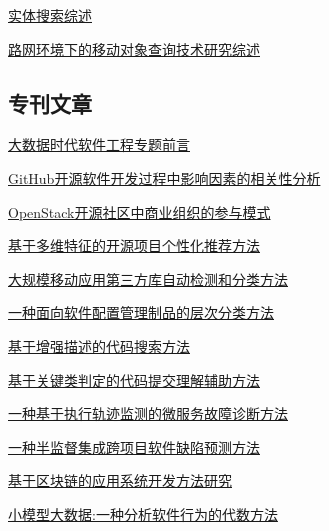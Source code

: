 \documentclass[a4paper]{article}
\begin{document}
\href{http://www.jos.org.cn/ch/reader/create_pdf.aspx?file_no=5256&year_id=2017&quarter_id=6&falg=1}{实体搜索综述}

\href{http://www.jos.org.cn/ch/reader/create_pdf.aspx?file_no=5254&year_id=2017&quarter_id=6&falg=1}{路网环境下的移动对象查询技术研究综述}

\subsection{专刊文章}
\href{http://www.jos.org.cn/ch/reader/create_pdf.aspx?file_no=5233&year_id=2017&quarter_id=6&falg=1}{大数据时代软件工程专题前言}

\href{http://www.jos.org.cn/ch/reader/create_pdf.aspx?file_no=5222&year_id=2017&quarter_id=6&falg=1}{GitHub开源软件开发过程中影响因素的相关性分析}

\href{http://www.jos.org.cn/ch/reader/create_pdf.aspx?file_no=5227&year_id=2017&quarter_id=6&falg=1}{OpenStack开源社区中商业组织的参与模式}

\href{http://www.jos.org.cn/ch/reader/create_pdf.aspx?file_no=5230&year_id=2017&quarter_id=6&falg=1}{基于多维特征的开源项目个性化推荐方法}

\href{http://www.jos.org.cn/ch/reader/create_pdf.aspx?file_no=5221&year_id=2017&quarter_id=6&falg=1}{大规模移动应用第三方库自动检测和分类方法}

\href{http://www.jos.org.cn/ch/reader/create_pdf.aspx?file_no=5224&year_id=2017&quarter_id=6&falg=1}{一种面向软件配置管理制品的层次分类方法}

\href{http://www.jos.org.cn/ch/reader/create_pdf.aspx?file_no=5226&year_id=2017&quarter_id=6&falg=1}{基于增强描述的代码搜索方法}

\href{http://www.jos.org.cn/ch/reader/create_pdf.aspx?file_no=5225&year_id=2017&quarter_id=6&falg=1}{基于关键类判定的代码提交理解辅助方法}

\href{http://www.jos.org.cn/ch/reader/create_pdf.aspx?file_no=5223&year_id=2017&quarter_id=6&falg=1}{一种基于执行轨迹监测的微服务故障诊断方法}

\href{http://www.jos.org.cn/ch/reader/create_pdf.aspx?file_no=5228&year_id=2017&quarter_id=6&falg=1}{一种半监督集成跨项目软件缺陷预测方法}

\href{http://www.jos.org.cn/ch/reader/create_pdf.aspx?file_no=5232&year_id=2017&quarter_id=6&falg=1}{基于区块链的应用系统开发方法研究}

\href{http://www.jos.org.cn/ch/reader/create_pdf.aspx?file_no=5229&year_id=2017&quarter_id=6&falg=1}{小模型大数据:一种分析软件行为的代数方法}
\end{document}
